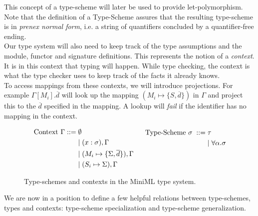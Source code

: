 \documentclass[10pt,a4paper]{report}
\begin{document}
This concept of a type-scheme will later be used to provide %
let-polymorphism.  Note that the definition of a Type-Scheme assures that the resulting type-scheme is in \emph{prenex normal form}, i.e. a string of quantifiers concluded by a quantifier-free ending.
\\[2ex]
Our type system will also need to keep track of the type assumptions and the module, functor and signature definitions. This represents the notion of a \emph{context}. It is in this context that typing will happen. While type checking, the context is what the type checker uses to keep track of the facts it already knows.
\\[2ex]
To access mappings from these contexts, we will introduce projections. For example $\Gamma[M_{i}].\overline{d}$ will look up the mapping $(M_{i} \mapsto \lbrace S,\overline{d}\rbrace)$ in $\Gamma$ and project this to the $\overline{d}$ specified in the mapping. A lookup will \emph{fail} if the identifier has no mapping in the context.

\begin{figure}[!htb]
\begin{align*}
\begin{aligned}
\text{Context }\Gamma ::=\; &\emptyset \\
&| \; (x:\sigma),\Gamma \\
&| \; (M_{i} \mapsto \lbrace \Sigma,\overline{d}\rbrace), \Gamma \\
&| \; (S_{i} \mapsto \Sigma), \Gamma
\end{aligned}
\begin{aligned}
\;\;\;\;\;\;
\end{aligned}
\begin{aligned}
\text{Type-Scheme } \sigma \; ::= \; &\tau \\
&| \; \forall \alpha . \sigma \\
\\
\\
\end{aligned}
\end{align*}
\caption{Type-schemes and contexts in the MiniML type system.}
\label{fig:Type-schemesAndContexts}
\end{figure}

We are now in a position to define a few helpful relations between type-schemes, types and contexts: type-scheme specialization and type-scheme generalization.
\end{document}

